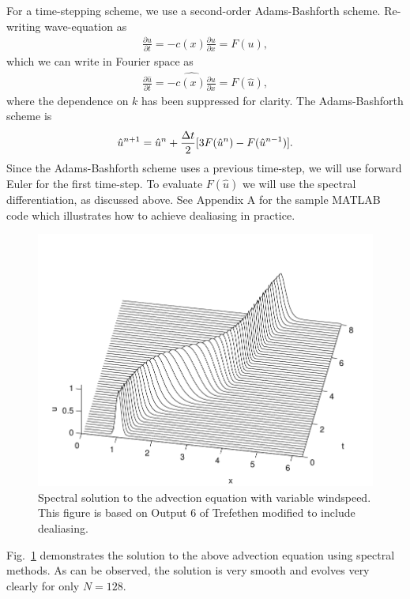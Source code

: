 For a time-stepping scheme, we use a second-order Adams-Bashforth\cite{durran} scheme. Re-writing wave-equation as
\begin{align}
\frac{\partial u}{\partial t} = -c(x)\frac{\partial u}{\partial x} = F(u),
\end{align}
which we can write in Fourier space as
\begin{align}
\frac{\partial \hat{u}}{\partial t} = \widehat{-c(x)\frac{\partial u}{\partial x}} = F(\hat{u}),
\end{align}
where the dependence on $k$ has been suppressed for clarity. The Adams-Bashforth scheme is
\begin{align}
\hat{u}^{n+1} = \hat{u}^{n} + \frac{\Delta t}{2}[3F(\hat{u}^{n})-F(\hat{u}^{n-1})].
\end{align}
Since the Adams-Bashforth scheme uses a previous time-step, we will use forward Euler for the first time-step. To evaluate $F(\hat{u})$ we will use the spectral differentiation, as discussed above. See Appendix A for the sample MATLAB code which illustrates how to achieve dealiasing in practice. 

\begin{figure}
\begin{center}
\includegraphics[width=\textwidth]{spectral_example.pdf}
\caption{Spectral solution to the advection equation with variable windspeed. This figure is based on Output 6 of Trefethen \cite{trefethen_spectral} modified to include dealiasing.}
\label{spectral_example}
\end{center}
\end{figure}
Fig.~\ref{spectral_example} demonstrates the solution to the above advection equation using spectral methods. As can be observed, the solution is very smooth and evolves very clearly for only $N=128$.

